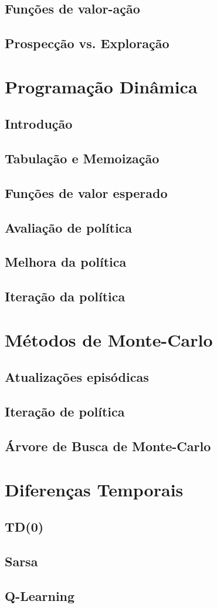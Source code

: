 \documentclass{article}
\begin{document}
    \subsection{Funções de valor-ação}
    \subsection{Prospecção vs. Exploração}

\section{Programação Dinâmica}

    \subsection{Introdução}
    \subsection{Tabulação e Memoização}
    \subsection{Funções de valor esperado}
    \subsection{Avaliação de política}
    \subsection{Melhora da política}
    \subsection{Iteração da política}

\section{Métodos de Monte-Carlo}

    \subsection{Atualizações episódicas}
    \subsection{Iteração de política}
    \subsection{Árvore de Busca de Monte-Carlo}

\section{Diferenças Temporais}

    \subsection{TD(0)}
    \subsection{Sarsa}
    \subsection{Q-Learning}
    
\end{document}
